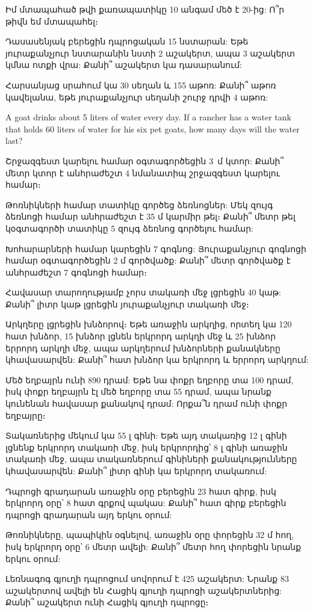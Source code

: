 \problem
Իմ մտապահած թվի քառապատիկը 10 անգամ մեծ է 20-ից: Ո՞ր 
թիվն եմ մտապահել։

\problem
Դասասենյակ բերեցին դպրոցական 15 նստարան: Եթե յուրաքանչյուր 
նստարանին նստի 2 աշակերտ, ապա 3 աշակերտ կմնա ոտքի վրա: 
Քանի՞ աշակերտ կա դասարանում:

\problem
Հարսանյաց սրահում կա 30 սեղան և 155 աթոռ: Քանի՞ աթոռ 
կավելանա, եթե յուրաքանչյուր սեղանի շուրջ դրվի 4 աթոռ:

\problem
A goat drinks about 5 liters of water every day. If a 
rancher has a water tank that holds 60 liters of water 
for his six pet goats, how many days will the water last?

\problem
Շրջազգեստ կարելու համար օգտագործեցին 3~մ կտոր: Քանի՞ 
մետր կտոր է անհրաժեշտ 4 նմանատիպ շրջազգեստ կարելու համար։

\problem
Թոռնիկների համար տատիկը գործեց ձեռնոցներ: Մեկ զույգ 
ձեռնոցի համար անհրաժեշտ է 35 մ կարմիր թել։ Քանի՞ մետր 
թել կօգտագործի տատիկը 5 զույգ ձեռնոց գործելու համար:

\problem
Խոհարարների համար կարեցին 7 գոգնոց: Յուրաքանչյուր 
գոգնոցի համար օգտագործեցին 2 մ գործվածք: Քանի՞ մետր 
գործվածք է անհրաժեշտ 7 գոգնոցի համար։

\problem
Հավասար տարողությամբ չորս տակառի մեջ լցրեցին 40 կաթ: 
Քանի՞ լիտր կաթ լցրեցին յուրաքանչյուր տակառի մեջ։

\problem
Արկղերը լցրեցին խնձորով։ Եթե առաջին արկղից, որտեղ կա 120 
հատ խնձոր, 15 խնձոր լցնեն երկրորդ արկղի մեջ և 25 խնձոր 
երրորդ արկղի մեջ, ապա արկղերում խնձորների քանակները 
կհավասարվեն: Քանի՞ հատ խնձոր կա երկրորդ և երրորդ արկղում:

\problem
Մեծ եղբայրն ունի 890 դրամ: Եթե նա փոքր եղբորը տա 100 դրամ, 
իսկ փոքր եղբայրն էլ մեծ եղբորը տա 55 դրամ, ապա նրանք կունենան 
հավասար քանակով դրամ: Որքա՞ն դրամ ունի փոքր եղբայրը։

\problem
Տակառներից մեկում կա 55 լ գինի: Եթե այդ տակառից 12 լ 
գինի լցնենք երկրորդ տակառի մեջ, իսկ երկրորդից՝ 8 լ գինի 
առաջին տակառի մեջ, ապա տակառներում գինիների քանակությունները 
կհավասարվեն: Քանի՞ լիտր գինի կա երկրորդ տակառում:

\problem
Դպրոցի գրադարան առաջին օրը բերեցին 23 հատ գիրք, իսկ երկրորդ 
օրը՝ 8 հատ գրքով պակաս: Քանի՞ հատ գիրք բերեցին դպրոցի գրադարան 
այդ երկու օրում:

\problem
Թոռնիկները, պապիկին օգնելով, առաջին օրը փորեցին 32 մ հող, իսկ 
երկրորդ օրը՝ 6 մետր ավելի: Քանի՞ մետր հող փորեցին նրանք երկու օրում:

\problem
Լեռնագոգ գյուղի դպրոցում սովորում է 425 աշակերտ: Նրանք 83 
աշակերտով ավելի են Հացիկ գյուղի դպրոցի աշակերտներից: Քանի՞ 
աշակերտ ունի Հացիկ գյուղի դպրոցը։

